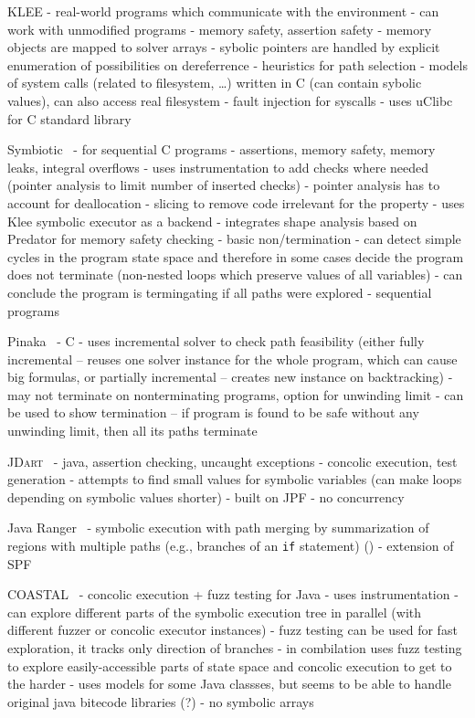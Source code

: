 KLEE 
- real-world programs which communicate with the environment
- can work with unmodified programs
- memory safety, assertion safety
- memory objects are mapped to solver arrays
- sybolic pointers are handled by explicit enumeration of possibilities on dereferrence
- heuristics for path selection
- models of system calls (related to filesystem, …) written in C (can contain sybolic values), can also access real filesystem
- fault injection for syscalls
- uses uClibc for C standard library



Symbiotic~
- for sequential C programs
- assertions, memory safety, memory leaks, integral overflows
- uses instrumentation to add checks where needed (pointer analysis to limit number of inserted checks)
  - pointer analysis has to account for deallocation
- slicing to remove code irrelevant for the property 
- uses Klee symbolic executor as a backend
- integrates shape analysis based on Predator\cite{TODO} for memory safety checking
- basic non/termination
    - can detect simple cycles in the program state space and therefore in some cases decide the program does not terminate (non-nested loops which preserve values of all variables)
    - can conclude the program is termingating if all paths were explored
- sequential programs

Pinaka~
- C
- uses incremental solver to check path feasibility (either fully incremental -- reuses one solver instance for the whole program, which can cause big formulas, or partially incremental -- creates new instance on backtracking)
- may not terminate on nonterminating programs, option for unwinding limit
- can be used to show termination -- if program is found to be safe without any unwinding limit, then all its paths terminate

\textsc{JDart}~
- java, assertion checking, uncaught exceptions
- concolic execution, test generation
- attempts to find small values for symbolic variables (can make loops depending on symbolic values shorter)
- built on JPF
- no concurrency

Java Ranger~
- symbolic execution with path merging by summarization of regions with multiple paths (e.g., branches of an \texttt{if} statement) ()
- extension of SPF

COASTAL~
- concolic execution + fuzz testing for Java
- uses instrumentation
- can explore different parts of the symbolic execution tree in parallel (with different fuzzer or concolic executor instances)
- fuzz testing can be used for fast exploration, it tracks only direction of branches
- in combilation uses fuzz testing to explore easily-accessible parts of state space and concolic execution to get to the harder
- uses models for some Java classses, but seems to be able to handle original java bitecode libraries (?)
- no symbolic arrays

